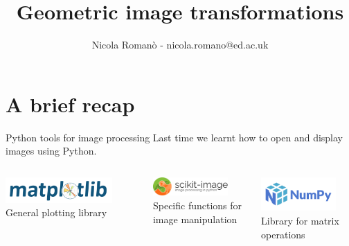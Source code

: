 \documentclass[9pt, aspectratio=169]{beamer}
\author{Nicola Roman\`o - nicola.romano@ed.ac.uk}
\title{Geometric image transformations}
\date{}
\begin{document}

\begin{frame}
    \titlepage
\end{frame}

\section{A brief recap}

\begin{frame}
    {Python tools for image processing}
    \centering
    Last time we learnt how to open and display images using Python.

    \vspace{3em}

    \begin{columns}
        \begin{column}{0.3\textwidth}
            \includegraphics[width=0.8\textwidth]{matplotlib_logo.png}
            General plotting library
        \end{column}
        \begin{column}{0.3\textwidth}
            \includegraphics[width=0.8\textwidth]{skimage_logo.png}
            Specific functions for image manipulation
        \end{column}
        \begin{column}{0.3\textwidth}
            \includegraphics[width=0.8\textwidth]{numpylogo.png}
            Library for matrix operations
        \end{column}
    \end{columns}
\end{frame}
\end{document}
